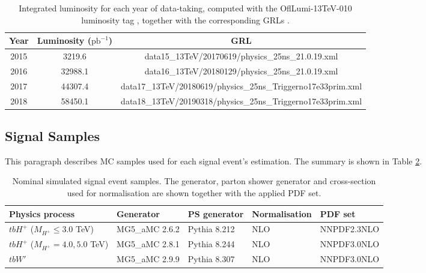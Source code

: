 \begin{table}[H]
  \centering
  \begin{tabular*}{150mm}{@{\extracolsep{\fill}}ccc}
    \hline\hline
    Year & Luminosity ($\text{pb}^{-1}$) & GRL\\
    \hline
    2015 & 3219.6  & data15\_13TeV/20170619/physics\_25ns\_21.0.19.xml\\
    2016 & 32988.1 & data16\_13TeV/20180129/physics\_25ns\_21.0.19.xml\\
    2017 & 44307.4 & data17\_13TeV/20180619/physics\_25ns\_Triggerno17e33prim.xml\\
    2018 & 58450.1 & data18\_13TeV/20190318/physics\_25ns\_Triggerno17e33prim.xml\\
    \hline\hline
  \end{tabular*}
  \caption{Integrated luminosity for each year of data-taking, computed with the OflLumi-13TeV-010 luminosity
  tag \cite{LuminosityForPhysis}, together with the corresponding GRLs \cite{GoodRunListRun2}.}
  \label{tab:GRLForData}
\end{table}

\subsection{Signal Samples}
\label{subsec:SignalSample}

This paragraph describes MC samples used for each signal event's estimation. The summary is shown in Table \ref{tab:SigSampleSummary}.

\begin{table}[H]
  \centering
  \begin{tabular*}{160mm}{@{\extracolsep{\fill}}lllll}
    \hline\hline
    Physics process & Generator & PS generator & Normalisation & PDF set\\
    \hline
    $tbH^{+}$ ($M_{H^{+}}\leq3.0$ TeV)  & MG5\_aMC 2.6.2 & Pythia 8.212 & NLO & NNPDF2.3NLO\\
    $tbH^{+}$ ($M_{H^{+}}=4.0,5.0$ TeV) & MG5\_aMC 2.8.1 & Pythia 8.244 & NLO & NNPDF3.0NLO\\
    $tbW'$                              & MG5\_aMC 2.9.9 & Pythia 8.307 & NLO & NNPDF3.0NLO\\
    \hline\hline
  \end{tabular*}
  \caption{Nominal simulated signal event samples. The generator, parton shower generator and cross-section used for normalisation are shown together with the applied PDF set.}
  \label{tab:SigSampleSummary}
\end{table}

